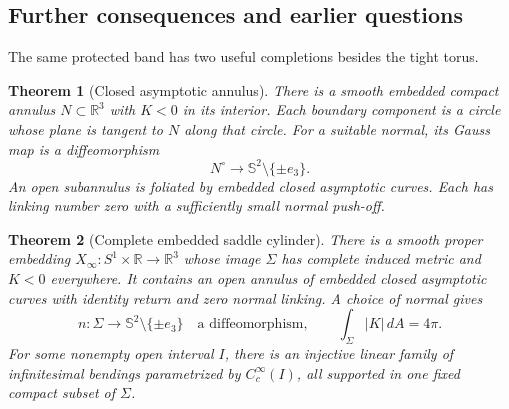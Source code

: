 \documentclass[11pt]{amsart}
\newtheorem{theorem}{Theorem}[section]
\theoremstyle{definition}
\theoremstyle{remark}
\newcommand{\R}{\mathbb R}\newcommand{\Sph}{\mathbb S}
\numberwithin{equation}{section}
\begin{document}
\subsection{Further consequences and earlier questions}
The same protected band has two useful completions besides the tight torus.
\begin{theorem}[Closed asymptotic annulus]\label{thm:main-annulus}
There is a smooth embedded compact annulus $N\subset\R^3$ with $K<0$
in its interior. Each boundary component is a circle whose plane is
tangent to $N$ along that circle.
For a suitable normal, its Gauss map is a diffeomorphism
\[
 N^\circ\longrightarrow\Sph^2\setminus\{\pm e_3\}.
\]
An open subannulus is foliated by embedded closed asymptotic curves.
Each has linking number zero with a sufficiently small normal push-off.
\end{theorem}

\begin{theorem}[Complete embedded saddle cylinder]\label{thm:complete-cylinder}
There is a smooth proper embedding $X_\infty:S^1\times\R\to\R^3$
whose image $\Sigma$ has complete induced metric and $K<0$ everywhere.
It contains an open annulus of embedded closed asymptotic curves with
identity return and zero normal linking. A choice of normal gives
\[
 n:\Sigma\longrightarrow\Sph^2\setminus\{\pm e_3\}
 \quad\text{a diffeomorphism},\qquad
 \int_\Sigma|K|\,dA=4\pi.
\]
For some nonempty open interval $I$, there is an injective linear family of
infinitesimal bendings parametrized by $C_c^\infty(I)$, all supported in
one fixed compact subset of $\Sigma$.
\end{theorem}
\end{document}
